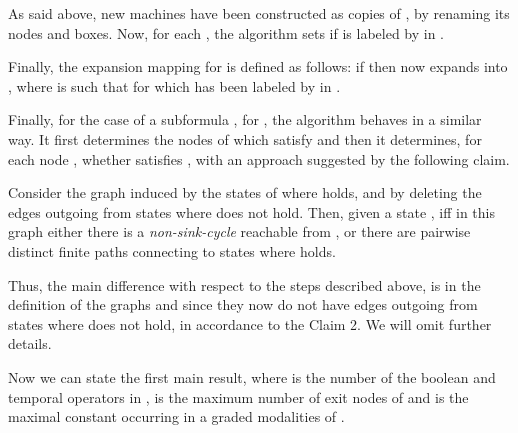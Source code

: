 \documentclass[letterpaper,twocolumn,10pt]{article}
\begin{document}
As said above,  new machines   have been constructed as copies of  , by renaming its nodes and boxes.
Now, for each , the algorithm sets  if  is labeled by  in .


Finally, the expansion mapping for  is defined as follows: if  then 
now expands into , where  is such that    for  which has been labeled by  in
.






Finally, for the case of a subformula , for , the algorithm
behaves in a similar way.
It first determines the nodes of  which satisfy
  and then it
 determines, for  each node , whether  satisfies ,
with an   approach suggested by the following claim.

Consider  the graph induced by the states of  where    holds,
and by deleting the edges outgoing from states
where  does not hold.
Then, given a state ,    iff in this graph
either there is a \emph{non-sink-cycle} reachable from , or
there are  pairwise distinct finite paths connecting  to
states where   holds.

Thus, the main difference with respect to the steps described above, is in the definition of
the graphs  and  since they now do not have edges  outgoing from states
where  does not hold, in accordance to the Claim 2.
We will omit further details.



Now we can state the first main result,
where  is  the number of the boolean and temporal operators in  ,
  is the maximum number of exit
nodes of  and  is the maximal constant occurring in a graded modalities of .
\end{document}
